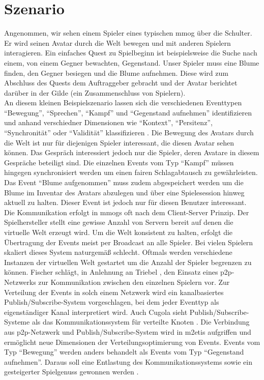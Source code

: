 \section{Szenario}
\label{chap:grundlagen:szenario}
Angenommen, wir sehen einem Spieler eines typischen \ac{mmog} über die Schulter. Er wird seinen Avatar durch die Welt bewegen und mit anderen Spielern interagieren. Ein einfaches Quest zu Spielbeginn ist beispielsweise die Suche nach einem, von einem Gegner bewachten, Gegenstand. Unser Spieler muss eine Blume finden, den Gegner besiegen und die Blume aufnehmen. Diese wird zum Abschluss des Quests dem Auftraggeber gebracht und der Avatar berichtet darüber in der Gilde (ein Zusammenschluss von Spielern).\\
An diesem kleinen Beispielszenario lassen sich die verschiedenen Eventtypen ``Bewegung'', ``Sprechen'', ``Kampf'' und ``Gegenstand aufnehmen'' identifizieren und anhand verschiedner Dimensionen wie ``Kontext'', ``Persitenz'', ``Synchronität'' oder ``Validität'' klassifizieren \cite{Fischer2010Event}. Die Bewegung des Avatars durch die Welt ist nur für diejenigen Spieler interessant, die diesen Avatar sehen können. Das Gespräch interessiert jedoch nur die Spieler, deren Avatare in diesem Gespräche beteiligt sind. Die einzelnen Events vom Typ ``Kampf'' müssen hingegen synchronisiert werden um einen fairen Schlagabtausch zu gewährleisten. Das Event ``Blume aufgenommen'' muss zudem abgespeichert werden um die Blume im Inventar des Avatars abzulegen und über eine Spielesession hinweg aktuell zu halten. Dieser Event ist jedoch nur für diesen Benutzer interessant.\\
Die Kommunikation erfolgt in \acp{mmog} oft nach dem Client-Server Prinzip. Der Spielhersteller stellt eine gewisse Anzahl von Servern bereit auf denen die virtuelle Welt erzeugt wird. Um die Welt konsistent zu halten, erfolgt die Übertragung der Events meist per Broadcast an alle Spieler. Bei vielen Spielern skaliert dieses System naturgemäß schlecht. Oftmals werden verschiedene Instanzen der virtuellen Welt gestartet um die Anzahl der Spieler begrenzen zu können. Fischer schlägt, in Anlehnung an Triebel \cite{Triebel2008Peertopeer}, den Einsatz eines \ac{p2p}-Netzwerks zur Kommunikation zwischen den einzelnen Spielern vor. Zur Verteilung der Events in solch einem Netzwerk wird ein kanalbasiertes Publish/Subscribe-System vorgeschlagen, bei dem jeder Eventtyp als eigenständiger Kanal interpretiert wird. Auch Cugola sieht Publish/Subscribe-Systeme als das Kommunikationssystem für verteilte Knoten \cite{Cugola2002Using}. Die Verbindung aus \ac{p2p}-Netzwerk und Publish/Subscribe-System wird in \ac{m2etis} aufgriffen und ermöglicht neue Dimensionen der Verteilungsoptimierung von Events. Events vom Typ ``Bewegung'' werden anders behandelt als Events vom Typ ``Gegenstand aufnehmen''. Daraus soll eine Entlastung des Kommunikationssystems sowie ein gesteigerter Spielgenuss gewonnen werden  \cite{Fischer2010a}.
